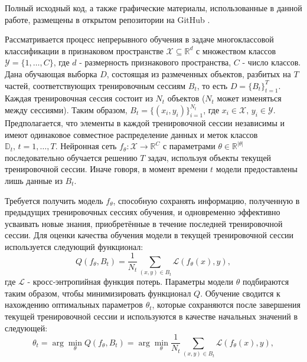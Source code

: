 \documentclass[a4paper,14pt]{extarticle}
\begin{document}
Полный исходный код, а также графические материалы, использованные в данной
работе, размещены в открытом репозитории на GitHub \cite{spbubachelorthesis}.
\pagebreak


Рассматривается процесс непрерывного обучения в задаче многоклассовой
классификации в признаковом пространстве \(\mathcal{X}\subseteq\mathbb{R}^d\)
с множеством классов \(\mathcal{Y}=\{1,\dots,C\}\), где \(d\) - размерность
признакового пространства, \(C\) - число классов. Дана обучающая выборка \(D\),
состоящая из размеченных объектов, разбитых на \(T\) частей, соответствующих
тренировочным сессиям \(B_t\), то есть \(D=\{B_t\}_{t=1}^T\). Каждая
тренировочная сессия состоит из \(N_t\) объектов (\(N_t\) может изменяться между
сессиями). Таким образом, \(B_t=\{(x_i,y_i)\}_{i=1}^{N_t}\), где
\(x_i\in\mathcal{X},\,y_i\in\mathcal{Y}\). Предполагается, что элементы в каждой
тренировочной сессии независимы и имеют одинаковое совместное распределение
данных и меток классов \(\mathbb{D}_t,\,t=1,\dots,T\). Нейронная сеть 
\(f_\theta:\mathcal{X} \to \mathbb{R}^C\) с параметрами
\(\theta\in\mathbb{R}^{\left|\theta\right|}\) последовательно обучается решению
\(T\) задач, используя объекты текущей тренировочной сессии. Иначе говоря, в 
момент времени \(t\) модели предоставлены лишь данные из \(B_t\).

Требуется получить модель \(f_\theta\), способную сохранять информацию,
полученную в предыдущих тренировочных сессиях обучения, и одновременно
эффективно усваивать новые знания, приобретённые в течение последней
тренировочной сессии. Для оценки качества обучения модели в текущей
тренировочной сессии используется следующий функционал:
\begin{equation}
    Q(f_\theta,B_t)=\frac{1}{N_t}\sum_{(x,y)\in B_t}\mathcal{L}(f_\theta(x),y),
\end{equation}
где \(\mathcal{L}\) - кросс‑энтропийная функция потерь. Параметры модели 
\(\theta\) подбираются таким образом, чтобы минимизировать функционал \(Q\).
Обучение сводится к нахождению оптимальных параметров \(\theta_t\), которые
сохраняются после завершения текущей тренировочной сессии и используются в
качестве начальных значений в следующей:
\begin{equation}
    \theta_t=\arg\min_{\theta}Q(f_\theta,B_t)=\arg\min_{\theta}\frac{1}{N_t}\sum_{(x,y)\in B_t}\mathcal{L}(f_\theta(x),y),
\end{equation}
\end{document}
